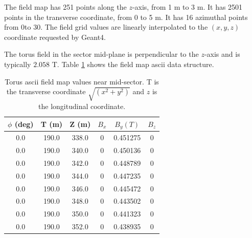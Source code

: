 The field map has 251 points along the $z$-axis, from 1 m to 3 m. It has 2501 points in the transverse coordinate, from 0 to 5 m.
It has 16 azimuthal points from 0\mdeg to 30\mdeg. The field grid values are linearly interpolated to the $(x,y,z)$
coordinate requested by Geant4.

The torus field in the sector mid-plane is perpendicular to the $z$-axis and is typically $2.058$ T.
Table \ref{tab:torMap} shows the field map ascii data structure.

\begin{table}[h]
	\begin{center}
		\begin{tabular}{| c | c | c | c | c | c | }
         $\phi$ (deg) & T (m)    & Z (m)    &  $B_x$  &    $B_y (T)$    & $B_z$\\
			\hline
          0.0         &  190.0   &  338.0   &  0       &     0.451275 &  0 \\
          0.0         &  190.0   &  340.0   &  0       &     0.450136 &  0 \\
          0.0         &  190.0   &  342.0   &  0       &     0.448789 &  0 \\
          0.0         &  190.0   &  344.0   &  0       &     0.447235 &  0 \\
          0.0         &  190.0   &  346.0   &  0       &     0.445472 &  0 \\
          0.0         &  190.0   &  348.0   &  0       &     0.443502 &  0 \\
          0.0         &  190.0   &  350.0   &  0       &     0.441323 &  0 \\
          0.0         &  190.0   &  352.0   &  0       &     0.438935 &  0 \\
		\end{tabular}
	\end{center}
	\caption{Torus ascii field map values near mid-sector. T is the transverse coordinate $\sqrt{(x^2+y^2)}$ and
             $z$ is the longitudinal coordinate.}
 	\label{tab:torMap}
\end{table}


